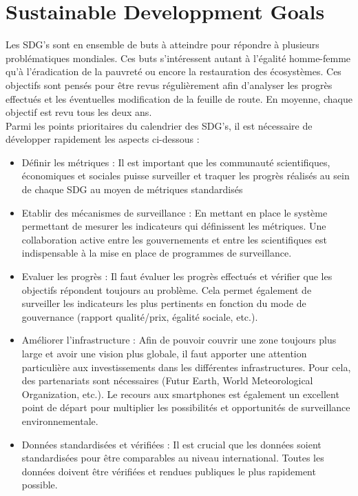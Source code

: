 \documentclass[10pt, article]{llncs}
\begin{document}
\section{Sustainable Developpment Goals}
		Les SDG's sont en ensemble de buts à atteindre pour répondre à plusieurs problématiques mondiales. Ces buts s'intéressent autant à l'égalité homme-femme qu'à l'éradication de la pauvreté ou encore la restauration des écosystèmes. Ces objectifs sont pensés pour être revus régulièrement afin d'analyser les progrès effectués et les éventuelles modification de la feuille de route. En moyenne, chaque objectif est revu tous les deux ans. \\
		Parmi les points prioritaires du calendrier des SDG's, il est nécessaire de développer rapidement les aspects ci-dessous \cite{lu_policy:_2015} :
		\begin{itemize}
			\item Définir les métriques : Il est important que les communauté scientifiques, économiques et sociales puisse surveiller et traquer les progrès réalisés au sein de chaque SDG au moyen de métriques standardisés
			\item Etablir des mécanismes de surveillance : En mettant en place le système permettant de mesurer les indicateurs qui définissent les métriques. Une collaboration active entre les gouvernements et entre les scientifiques est indispensable à la mise en place de programmes de surveillance. 
			\item Evaluer les progrès : Il faut évaluer les progrès effectués et vérifier que les objectifs répondent toujours au problème. Cela permet également de surveiller les indicateurs les plus pertinents en fonction du mode de gouvernance (rapport qualité/prix, égalité sociale, etc.).
			\item Améliorer l'infrastructure : Afin de pouvoir couvrir une zone toujours plus large et avoir une vision plus globale, il faut apporter une attention particulière aux investissements dans les différentes infrastructures. Pour cela, des partenariats sont nécessaires (Futur Earth, World Meteorological Organization, etc.). Le recours aux smartphones est également un excellent point de départ pour multiplier les possibilités et opportunités de surveillance environnementale.
			\item Données standardisées et vérifiées : Il est crucial que les données soient standardisées pour être comparables au niveau international. Toutes les données doivent être vérifiées et rendues publiques le plus rapidement possible.
		\end{itemize}
\end{document}
